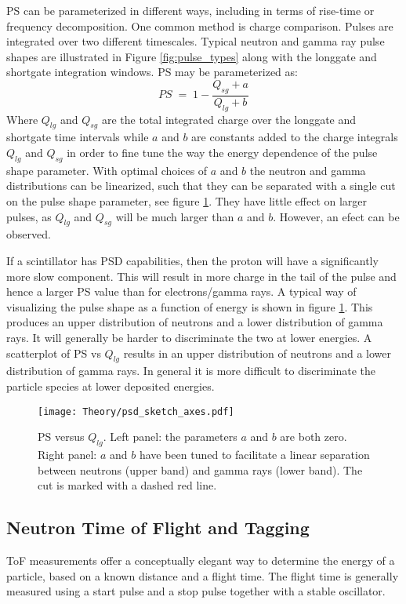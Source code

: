 \documentclass[main.tex]{subfiles}
\begin{document}
PS can be parameterized in different ways, including in terms of rise-time or frequency decomposition. One common method is charge comparison. Pulses are integrated over two different timescales. Typical neutron and gamma ray pulse shapes are illustrated in Figure \ref{fig:pulse_types} along with the longgate and shortgate integration windows. PS may be parameterized as:
\begin{equation}
	PS \; = \; 1-\frac{Q_{sg} + a}{Q_{lg} + b}
	\label{eq:ps}
\end{equation}
Where $Q_{lg}$ and $Q_{sg}$ are the total integrated charge over the longgate and shortgate time intervals while $a$ and $b$ are constants added to the charge integrals $Q_{lg}$ and $Q_{sg}$ in order to fine tune the way the energy dependence of the pulse shape parameter. With optimal choices of $a$ and $b$ the neutron and gamma distributions can be linearized, such that they can be separated with a single cut on the pulse shape parameter, see figure \ref{fig:psd_sketch}. They have little effect on larger pulses, as $Q_{lg}$ and $Q_{sg}$ will be much larger than $a$ and $b$. However, an efect can be observed.

If a scintillator has PSD capabilities, then the proton will have a significantly more slow component. This will result in more charge in the tail of the pulse and hence a larger PS value than for electrons/gamma rays. A typical way of visualizing the pulse shape as a function of energy is shown in figure \ref{fig:psd_sketch}. This produces an upper distribution of neutrons and a lower distribution of gamma rays. It will generally be harder to discriminate the two at lower energies.
A scatterplot of PS vs $Q_{lg}$ results in an upper distribution of neutrons and a lower distribution of gamma rays. In general it is more difficult to discriminate the particle species at lower deposited energies.
\begin{figure}[ht]
    \centering
        \texttt{[image: Theory/psd\_sketch\_axes.pdf]}
        \caption[PS versus $Q_{lg}$]{PS versus $Q_{lg}$. Left panel: the parameters $a$ and $b$ are both zero. Right panel: $a$ and $b$ have been tuned to facilitate a linear separation between neutrons (upper band) and gamma rays (lower band). The cut is marked with a dashed red line.}
    \label{fig:psd_sketch} 
\end{figure}


\subsection{Neutron Time of Flight and Tagging}
ToF measurements offer a conceptually elegant way to determine the energy of a particle, based on a known distance and a flight time. The flight time is generally measured using a start pulse and a stop pulse together with a stable oscillator.
\end{document}
